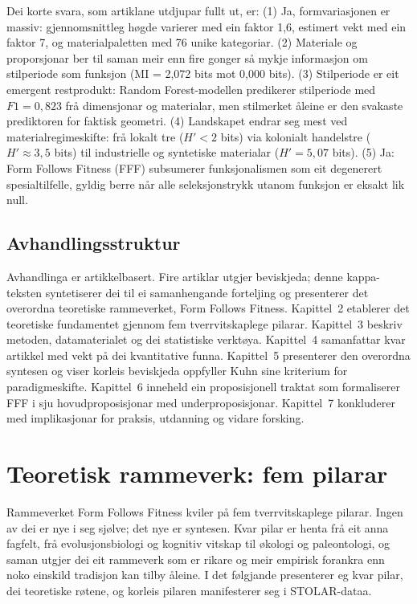 \documentclass[12pt, a4paper]{article}
\begin{document}
Dei korte svara, som artiklane utdjupar fullt ut, er: (1) Ja, formvariasjonen er massiv: gjennomsnittleg høgde varierer med ein faktor 1,6, estimert vekt med ein faktor 7, og materialpaletten med 76 unike kategoriar. (2) Materiale og proporsjonar ber til saman meir enn fire gonger så mykje informasjon om stilperiode som funksjon (MI = 2,072 bits mot 0,000 bits). (3) Stilperiode er eit emergent restprodukt: Random Forest-modellen predikerer stilperiode med $F1 = 0{,}823$ frå dimensjonar og materialar, men stilmerket åleine er den svakaste prediktoren for faktisk geometri. (4) Landskapet endrar seg mest ved materialregimeskifte: frå lokalt tre ($H' < 2$ bits) via kolonialt handelstre ($H' \approx 3{,}5$ bits) til industrielle og syntetiske materialar ($H' = 5{,}07$ bits). (5) Ja: Form Follows Fitness (FFF) subsumerer funksjonalismen som eit degenerert spesialtilfelle, gyldig berre når alle seleksjonstrykk utanom funksjon er eksakt lik null.

\subsection{Avhandlingsstruktur}

Avhandlinga er artikkelbasert. Fire artiklar utgjer beviskjeda; denne kappa-teksten syntetiserer dei til ei samanhengande forteljing og presenterer det overordna teoretiske rammeverket, Form Follows Fitness. Kapittel~2 etablerer det teoretiske fundamentet gjennom fem tverrvitskaplege pilarar. Kapittel~3 beskriv metoden, datamaterialet og dei statistiske verktøya. Kapittel~4 samanfattar kvar artikkel med vekt på dei kvantitative funna. Kapittel~5 presenterer den overordna syntesen og viser korleis beviskjeda oppfyller Kuhn sine kriterium for paradigmeskifte. Kapittel~6 inneheld ein proposisjonell traktat som formaliserer FFF i sju hovudproposisjonar med underproposisjonar. Kapittel~7 konkluderer med implikasjonar for praksis, utdanning og vidare forsking.


\section{Teoretisk rammeverk: fem pilarar}

Rammeverket Form Follows Fitness kviler på fem tverrvitskaplege pilarar. Ingen av dei er nye i seg sjølve; det nye er syntesen. Kvar pilar er henta frå eit anna fagfelt, frå evolusjonsbiologi og kognitiv vitskap til økologi og paleontologi, og saman utgjer dei eit rammeverk som er rikare og meir empirisk forankra enn noko einskild tradisjon kan tilby åleine. I det følgjande presenterer eg kvar pilar, dei teoretiske røtene, og korleis pilaren manifesterer seg i STOLAR-dataa.
\end{document}
